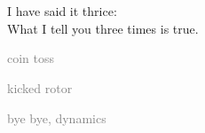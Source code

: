 %

\section[\catlatt]
 {\catlatt}
\label{s:catLatt}

\begin{frame}{}
\begin{bartlett}{
I have said it thrice: \\
What I tell you three times is true.
        }
\end{bartlett}
\vfill
\begin{enumerate}
              \item \textcolor{gray}{\small
coin toss
              \item
kicked rotor
                  }
              \item {\Large
\catlatt
                  }\textcolor{gray}{\small
              \item
bye bye, dynamics
                    }
            \end{enumerate}
\end{frame} %


